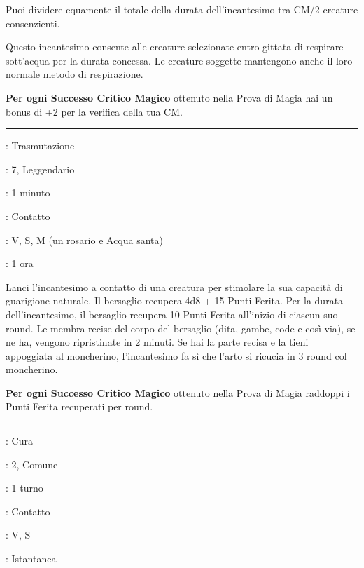 \begin{multicols}{2}
Puoi dividere equamente il totale della durata dell'incantesimo tra CM/2 creature consenzienti.

Questo incantesimo consente  alle creature selezionate entro gittata di respirare sott'acqua per la durata concessa. Le creature soggette mantengono anche il loro normale metodo di respirazione.

\textbf{Per ogni Successo Critico Magico} ottenuto nella Prova di Magia hai un bonus di +2 per la verifica della tua CM.

\smallskip\noindent\rule{\linewidth}{2pt} \hypertarget{Rigenerazione}{}\medskip{}
\noindent
\begin{description}[noitemsep, topsep=0pt, parsep=0pt, partopsep=0pt, leftmargin=0cm, labelwidth=2.8cm]
	\item[\textbf{Lista di Magia}]: Trasmutazione
	\item[\textbf{Livello}]: 7, Leggendario
	\item[\textbf{T. di Lancio}]: 1 minuto
	\item[\textbf{Gittata}]: Contatto
	\item[\textbf{Componenti}]: V, S, M (un rosario e Acqua santa)
	\item[\textbf{Durata}]: 1 ora
\end{description}

Lanci l'incantesimo a contatto di una creatura per stimolare la sua capacità di guarigione naturale. Il bersaglio recupera 4d8 + 15 Punti Ferita. Per la durata dell'incantesimo, il bersaglio recupera 10 Punti Ferita all'inizio di ciascun suo round. Le membra recise del corpo del bersaglio (dita, gambe, code e così via), se ne ha, vengono ripristinate in 2 minuti. Se hai la parte recisa e la tieni appoggiata al moncherino, l'incantesimo fa sì che l'arto si ricucia in 3 round col moncherino.

\textbf{Per ogni Successo Critico Magico} ottenuto nella Prova di Magia raddoppi i Punti Ferita recuperati per round.

\smallskip\noindent\rule{\linewidth}{2pt} \hypertarget{Rimuovi Malattia}{}\medskip{}
\label{rimuovimalattie}\hypertarget{rimuovimalattie}{}
\noindent
\begin{description}[noitemsep, topsep=0pt, parsep=0pt, partopsep=0pt, leftmargin=0cm, labelwidth=2.8cm]
	\item[\textbf{Lista di Magia}]: Cura
	\item[\textbf{Livello}]: 2, Comune
	\item[\textbf{T. di Lancio}]: 1 turno
	\item[\textbf{Gittata}]: Contatto
	\item[\textbf{Componenti}]: V, S
	\item[\textbf{Durata}]: Istantanea
\end{description}


\end{multicols}
